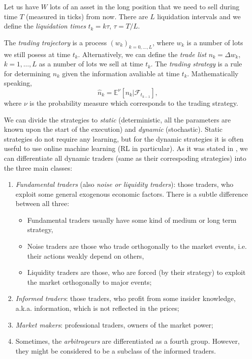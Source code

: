     Let us have $W$ lots of an asset in the long position that we need to sell during time $T$ (measured in ticks) from now.
    There are $L$ liquidation intervals and we define the \emph{liquidation times} $t_k = k\tau$, $\tau = T/L$.
    \begin{definition}\label{definition:tradingtrajectory}
        The \emph{trading trajectory} is a process $(w_k)_{k = 0, \dots, L}$, where $w_k$ is a number of lots we 
        still posess at time $t_k$. Alternatively, we can define the \emph{trade list} $n_k = \Delta w_k$, $k = 1, \dots, L$ as a 
        number of lots we sell at time $t_k$.
        The \emph{trading strategy} is a rule for determining $n_k$ given the information avaliable at time $t_k$. Mathematically speaking,
        \begin{equation*}
            \hat n_k = \mathbb{E}^\nu\left[n_k\vert \mathcal{F}_{t_{k-1}}\right],
        \end{equation*} 
        where $\nu$ is the probability measure which corresponds to the trading strategy.
    \end{definition}
    We can divide the strategies to \emph{static} (deterministic, all the parameters are known upon the start of the execution) and \emph{dynamic} (stochastic).
    Static strategies do not require any learning, but for the dynamic strategies it is often useful to use online machine learning (RL in particular).
    As it was stated in \cite{Cartea2015}, we can differentiate all dynamic traders (same as their correspoding strategies) into the three main classes:
    \begin{enumerate}
        \item \emph{Fundamental traders} (also \emph{noise \emph{or} liquidity traders}): those traders, who exploit some general exogenous economic factors. There is a subtle difference between all three: \begin{itemize}
            \item Fundamental traders usually have some kind of medium or long term strategy,
            \item Noise traders are those who trade orthogonally to the market events, i.e. their actions weakly depend on others,
            \item Liquidity traders are those, who are forced (by their strategy) to exploit the market orthogonally to major events;
        \end{itemize}
        \item \emph{Informed traders}: those traders, who profit from some insider knowledge, a.k.a. information, which is not reflected in the prices;
        \item \emph{Market makers}: professional traders, owners of the market power;
        \item Sometimes, the \emph{arbitrageurs} are differentiated as a fourth group. However, they might be considered to be a subclass of the informed traders.
    \end{enumerate}

